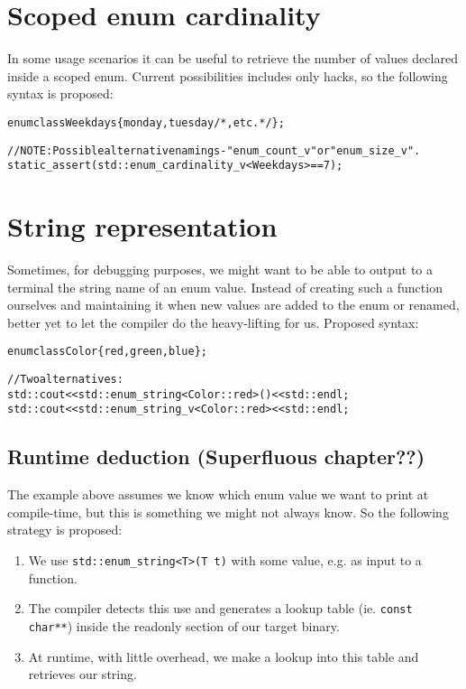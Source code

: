 \documentclass[a4paper, 12pt]{article}
\begin{document}
\section{Scoped enum cardinality}

In some usage scenarios it can be useful to retrieve the number of values
declared inside a scoped enum. Current possibilities includes only hacks,
so the following syntax is proposed:

\begin{alltt}\footnotesize
enum class Weekdays \{ monday, tuesday /*, etc. */ \};

// NOTE: Possible alternative namings - "enum\_count\_v" or "enum\_size\_v".
static\_assert(std::enum\_cardinality\_v<Weekdays> == 7);
\end{alltt}



\section{String representation}

Sometimes, for debugging purposes, we might want to be able to output to a
terminal the string name of an enum value. Instead of creating such a function
ourselves and maintaining it when new values are added to the enum or renamed,
better yet to let the compiler do the heavy-lifting for us. Proposed syntax:

\begin{alltt}\footnotesize
enum class Color \{ red, green, blue \};

// Two alternatives:
std::cout << std::enum\_string<Color::red>() << std::endl;
std::cout << std::enum\_string\_v<Color::red> << std::endl;
\end{alltt}


\subsection{Runtime deduction (Superfluous chapter??)}

The example above assumes we know which enum value we want to print at
compile-time, but this is something we might not always know. So the following
strategy is proposed:

\begin{enumerate}
\item We use \texttt{std::enum\_string<T>(T t)} with some value, e.g. as input
  to a function.
\item The compiler detects this use and generates a lookup table (ie.
  \texttt{const char**}) inside the readonly section of our target binary.
\item At runtime, with little overhead, we make a lookup into this table and
  retrieves our string.
\end{enumerate}
\end{document}

